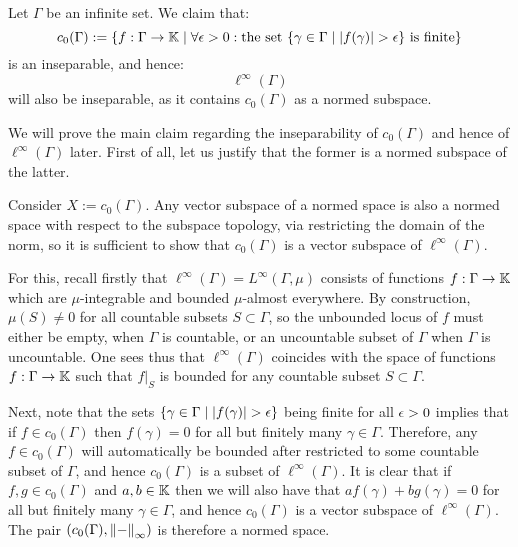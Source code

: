         \begin{example} \label{example: ell_infinity_spaces_of_infinite_dimensions_is_inseparable}
            Let $\Gamma$ be an infinite set. We claim that:
                $$c_0(\Gamma) := \{ f: \Gamma \to \mathbb{K} \mid \forall \epsilon > 0: \text{the set $\{ \gamma \in \Gamma \mid \left\lvert {f(\gamma)} \right\rvert > \epsilon \}$ is finite} \}$$
            is an inseparable, and hence:
                $$\ell^{\infty}(\Gamma)$$
            will also be inseparable, as it contains $c_0(\Gamma)$ as a normed subspace.

            We will prove the main claim regarding the inseparability of $c_0(\Gamma)$ and hence of $\ell^{\infty}(\Gamma)$ later. First of all, let us justify that the former is a normed subspace of the latter. 
        
            Consider $X := c_0(\Gamma)$. Any vector subspace of a normed space is also a normed space with respect to the subspace topology, via restricting the domain of the norm, so it is sufficient to show that $c_0(\Gamma)$ is a vector subspace of $\ell^{\infty}(\Gamma)$.
                    
            For this, recall firstly that $\ell^{\infty}(\Gamma) = L^{\infty}(\Gamma, \mu)$ consists of functions $f: \Gamma \to \mathbb{K}$ which are $\mu$-integrable and bounded $\mu$-almost everywhere. By construction, $\mu(S) \not = 0$ for all countable subsets $S \subset \Gamma$, so the unbounded locus of $f$ must either be empty, when $\Gamma$ is countable, or an uncountable subset of $\Gamma$ when $\Gamma$ is uncountable. One sees thus that $\ell^{\infty}(\Gamma)$ coincides with the space of functions $f: \Gamma \to \mathbb{K}$ such that $f|_S$ is bounded for any countable subset $S \subset \Gamma$.
            
            Next, note that the sets $\{ \gamma \in \Gamma \mid \left\lvert {f(\gamma)} \right\rvert > \epsilon \}$ being finite for all $\epsilon > 0$ implies that if $f \in c_0(\Gamma)$ then $f(\gamma) = 0$ for all but finitely many $\gamma \in \Gamma$. Therefore, any $f \in c_0(\Gamma)$ will automatically be bounded after restricted to some countable subset of $\Gamma$, and hence $c_0(\Gamma)$ is a subset of $\ell^{\infty}(\Gamma)$. It is clear that if $f, g \in c_0(\Gamma)$ and $a, b \in \mathbb{K}$ then we will also have that $af(\gamma) + bg(\gamma) = 0$ for all but finitely many $\gamma \in \Gamma$, and hence $c_0(\Gamma)$ is a vector subspace of $\ell^{\infty}(\Gamma)$. The pair $( c_0(\Gamma), \left\| {-} \right\|_{\infty} )$ is therefore a normed space.
        \end{example}
